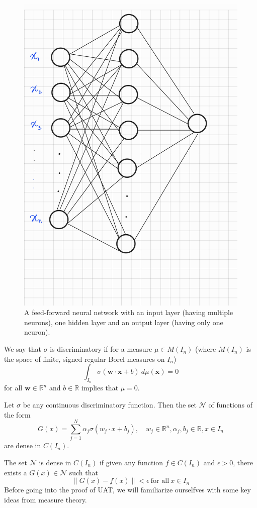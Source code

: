 \begin{figure}[htbp]
    \centering
    \includegraphics[width=.4\textwidth]{Figures/ffnn_UAT.jpg}
    \caption{A feed-forward neural network with an input layer (having multiple neurons), one hidden layer and an output layer (having only one neuron).}
    \label{fig:ffnn_UAT}
\end{figure}
\begin{definition}
    We say that $\sigma$ is discriminatory if for a measure $\mu \in M(I_n)$ (where $M(I_n)$ is the space 
of finite, signed regular Borel measures on $I_n$) 
$$\int_{I_n} \sigma (\mathbf{w}\cdot\mathbf{x} + b) \ d\mu(\mathbf{x}) = 0$$
for all $\mathbf{w} \in \mathbb{R}^n$ and $b\in \mathbb{R}$ implies that $\mu = 0$.
\end{definition}
\begin{thm}
    Let $\sigma$ be any continuous discriminatory function. Then the set $\mathcal{N}$ of functions of the form 
    $$G(x) = \sum_{j=1}^{N} \alpha_j \sigma (w_j\cdot x + b_j), \quad w_j \in \mathbb{R}^n, \alpha_j, b_j \in \mathbb{R}, x \in I_n$$
    are dense in $C(I_n)$.
\end{thm}
The set $\mathcal{N}$ is dense in $C(I_n)$ if given any function $f \in C(I_n)$ and $\epsilon > 0$, there exists
a $G(x) \in \mathcal{N}$ such that 
$$\| G(x) - f(x)\| < \epsilon \ \text{for all} \ x \in I_n$$
Before going into the proof of UAT, we will familiarize ourselfves with some key ideas from measure theory.
